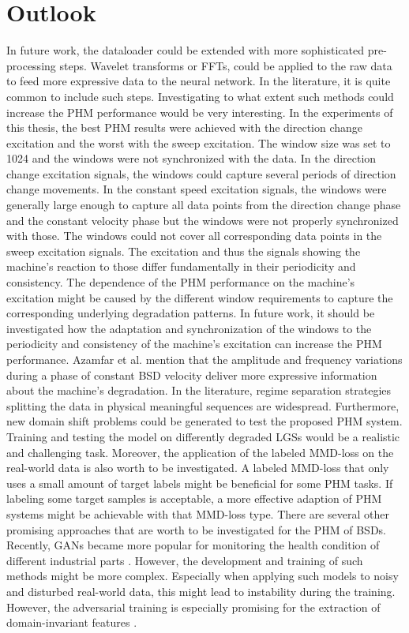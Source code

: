 \chapter{Outlook}
In future work, the dataloader could be extended with more sophisticated pre-processing steps. Wavelet transforms or FFTs, could be applied to the raw data to feed more expressive data to the neural network. In the literature, it is quite common to include such steps. Investigating to what extent such methods could increase the PHM performance would be very interesting.
In the experiments of this thesis, the best PHM results were achieved with the direction change excitation and the worst with the sweep excitation. The window size was set to 1024 and the windows were not synchronized with the data. In the direction change excitation signals, the windows could capture several periods of direction change movements. In the constant speed excitation signals, the windows were generally large enough to capture all data points from the direction change phase and the constant velocity phase but the windows were not properly synchronized with those. The windows could not cover all corresponding data points in the sweep excitation signals. The excitation and thus the signals showing the machine's reaction to those differ fundamentally in their periodicity and consistency. The dependence of the PHM performance on the machine's excitation might be caused by the different window requirements to capture the corresponding underlying degradation patterns. In future work, it should be investigated how the adaptation and synchronization of the windows to the periodicity and consistency of the machine's excitation can increase the PHM performance. Azamfar et al. \cite{AZAMFAR2020103932} mention that the amplitude and frequency variations during a phase of constant BSD velocity deliver more expressive information about the machine's degradation. In the literature, regime separation strategies splitting the data in physical meaningful sequences are widespread.
Furthermore, new domain shift problems could be generated to test the proposed PHM system. Training and testing the model on differently degraded LGSs would be a realistic and challenging task.
Moreover, the application of the labeled MMD-loss on the real-world data is also worth to be investigated. A labeled MMD-loss that only uses a small amount of target labels might be beneficial for some PHM tasks.  If labeling some target samples is acceptable, a more effective adaption of PHM systems might be achievable with that MMD-loss type.
There are several other promising approaches that are worth to be investigated for the PHM of BSDs. Recently, GANs became more popular for monitoring the health condition of different industrial parts \cite{Zhang2019}. However, the development and training of such methods might be more complex. Especially when applying such models to noisy and disturbed real-world data, this might lead to instability during the training. However, the adversarial training is especially promising for the extraction of domain-invariant features \cite{Zhang2019}. 




